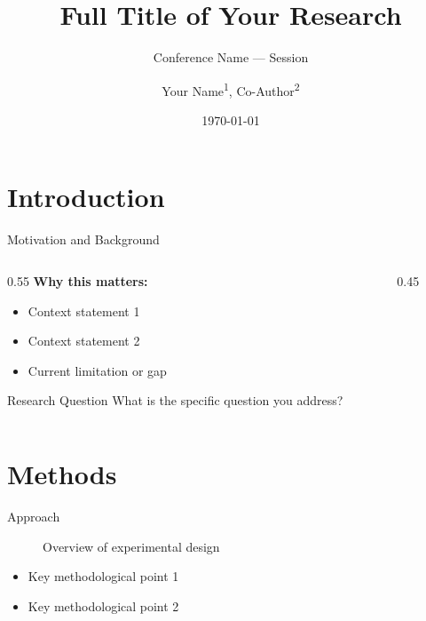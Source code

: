\documentclass[aspectratio=169,11pt]{beamer}
\title[Short Title]{Full Title of Your Research}
\subtitle{Conference Name — Session}
\author[Your Name]{Your Name\textsuperscript{1}, Co-Author\textsuperscript{2}}
\institute[Affiliation]{
  \textsuperscript{1}Department, University\\
  \textsuperscript{2}Department, Institution\\
  \texttt{email@university.edu}
}
\date{\today}
\begin{document}
\begin{frame}[plain]
  \titlepage
\end{frame}

\section{Introduction}

\begin{frame}{Motivation and Background}
  \begin{columns}[T]
    \begin{column}{0.55\textwidth}
      \textbf{Why this matters:}
      \begin{itemize}
        \item Context statement 1
        \item Context statement 2
        \item Current limitation or gap
      \end{itemize}
      \vspace{0.5cm}
      \begin{block}{Research Question}
        What is the specific question you address?
      \end{block}
    \end{column}
    \begin{column}{0.45\textwidth}
    \end{column}
  \end{columns}
\end{frame}

\section{Methods}

\begin{frame}{Approach}
  \begin{figure}
    \centering
    \caption{Overview of experimental design}
  \end{figure}
  \begin{itemize}
    \item Key methodological point 1
    \item Key methodological point 2
  \end{itemize}
\end{frame}
\end{document}
